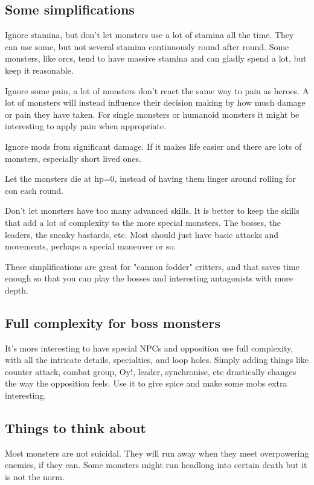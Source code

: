 \subsection*{Some simplifications}
Ignore stamina, but don't let monsters use a lot of stamina all the time. They can use some, but not several stamina continuously round after round. Some monsters, like orcs, tend to have massive stamina and can gladly spend a lot, but keep it reasonable.

Ignore some pain, a lot of monsters don't react the same way to pain as heroes. A lot of monsters will instead influence their decision making by how much damage or pain they have taken. For single monsters or humanoid monsters it might be interesting to apply pain when appropriate.

Ignore mods from significant damage. If it makes life easier and there are lots of monsters, especially short lived ones.

Let the monsters die at hp=0, instead of having them linger around rolling for con each round.

Don't let monsters have too many advanced skills. It is better to keep the skills that add a lot of complexity to the more special monsters. The bosses, the leaders, the sneaky bastards, etc. Most should just have basic attacks and movements, perhaps a special maneuver or so.

These simplifications are great for "cannon fodder" critters, and that saves time enough so that you can play the bosses and interesting antagonists with more depth.


\subsection*{Full complexity for boss monsters}
It's more interesting to have special NPCs and opposition use full complexity, with all the intricate details, specialties, and loop holes. Simply adding things like counter attack, combat group, Oy!, leader, synchronise, etc drastically changes the way the opposition feels. Use it to give spice and make some mobs extra interesting.


\subsection*{Things to think about}
Most monsters are not suicidal. They will run away when they meet overpowering enemies, if they can. Some monsters might run headlong into certain death but it is not the norm.

